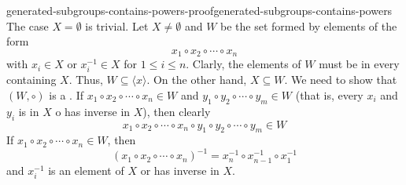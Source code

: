 \documentclass[preview]{standalone}
\begin{document}
\begin{snippetproof}{generated-subgroups-contains-powers-proof}{generated-subgroups-contains-powers}{}
    The case \(X=\emptyset\) is trivial.
    Let \(X \neq \emptyset\) and \(W\) be the set formed by elements of the form
    \[
        x_1 \circ x_2 \circ \cdots \circ x_n
    \]
    with \(x_i \in X\) or \(x_i^{-1} \in X\) for \(1 \leq i \leq n\).
    Clarly, the elements of \(W\) must be in every \subgroup[subgroups] containing \(X\).
    Thus, \(W \subseteq \langle x \rangle\).
    On the other hand, \(X \subseteq W\).
    We need to show that \((W, \circ)\) is a \subgroup.
    If \(x_1 \circ x_2 \circ \cdots \circ x_n \in W\) and
    \(y_1 \circ y_2 \circ \cdots \circ y_m \in W\) (that is, every \(x_i\) and \(y_i\)
    is in \(X\) o has inverse in \(X\)), then clearly
    \[
        x_1 \circ x_2 \circ \cdots \circ x_n
        \circ
        y_1 \circ y_2 \circ \cdots \circ y_m
        \in W
    \]
    If \(x_1 \circ x_2 \circ \cdots \circ x_n \in W\), then\[
        {(x_1 \circ x_2 \circ \cdots \circ x_n)}^{-1}
        = x_n^{-1} \circ x_{n-1}^{-1} \circ x_1^{-1}
    \]
    and \(x_i^{-1}\) is an element of \(X\)
    or has inverse in \(X\).
\end{snippetproof}
\end{document}

